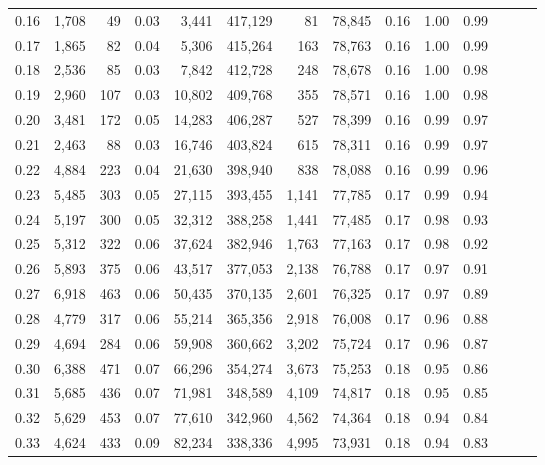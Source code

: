 \begin{tabular}{rrrrrrrrrrrrrr}
0.16 &   1,708 &     49 &  0.03 &    3,441 &  417,129 &      81 &  78,845 &  0.16 &  1.00 &      0.99 \\
0.17 &   1,865 &     82 &  0.04 &    5,306 &  415,264 &     163 &  78,763 &  0.16 &  1.00 &      0.99 \\
0.18 &   2,536 &     85 &  0.03 &    7,842 &  412,728 &     248 &  78,678 &  0.16 &  1.00 &      0.98 \\
0.19 &   2,960 &    107 &  0.03 &   10,802 &  409,768 &     355 &  78,571 &  0.16 &  1.00 &      0.98 \\
0.20 &   3,481 &    172 &  0.05 &   14,283 &  406,287 &     527 &  78,399 &  0.16 &  0.99 &      0.97 \\
0.21 &   2,463 &     88 &  0.03 &   16,746 &  403,824 &     615 &  78,311 &  0.16 &  0.99 &      0.97 \\
0.22 &   4,884 &    223 &  0.04 &   21,630 &  398,940 &     838 &  78,088 &  0.16 &  0.99 &      0.96 \\
0.23 &   5,485 &    303 &  0.05 &   27,115 &  393,455 &   1,141 &  77,785 &  0.17 &  0.99 &      0.94 \\
0.24 &   5,197 &    300 &  0.05 &   32,312 &  388,258 &   1,441 &  77,485 &  0.17 &  0.98 &      0.93 \\
0.25 &   5,312 &    322 &  0.06 &   37,624 &  382,946 &   1,763 &  77,163 &  0.17 &  0.98 &      0.92 \\
0.26 &   5,893 &    375 &  0.06 &   43,517 &  377,053 &   2,138 &  76,788 &  0.17 &  0.97 &      0.91 \\
0.27 &   6,918 &    463 &  0.06 &   50,435 &  370,135 &   2,601 &  76,325 &  0.17 &  0.97 &      0.89 \\
0.28 &   4,779 &    317 &  0.06 &   55,214 &  365,356 &   2,918 &  76,008 &  0.17 &  0.96 &      0.88 \\
0.29 &   4,694 &    284 &  0.06 &   59,908 &  360,662 &   3,202 &  75,724 &  0.17 &  0.96 &      0.87 \\
0.30 &   6,388 &    471 &  0.07 &   66,296 &  354,274 &   3,673 &  75,253 &  0.18 &  0.95 &      0.86 \\
0.31 &   5,685 &    436 &  0.07 &   71,981 &  348,589 &   4,109 &  74,817 &  0.18 &  0.95 &      0.85 \\
0.32 &   5,629 &    453 &  0.07 &   77,610 &  342,960 &   4,562 &  74,364 &  0.18 &  0.94 &      0.84 \\
0.33 &   4,624 &    433 &  0.09 &   82,234 &  338,336 &   4,995 &  73,931 &  0.18 &  0.94 &      0.83 \\

\end{tabular}

